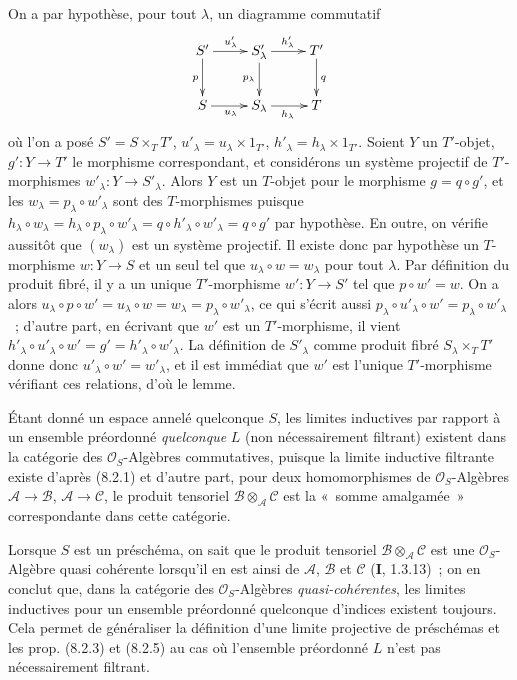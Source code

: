 On a par hypothèse, pour tout $\lambda$, un diagramme commutatif
\[
\xymatrix{
  S' \ar[r]^{u'_\lambda} \ar[d]_p
    & S'_\lambda \ar[r]^{h'_\lambda} \ar[d]_{p_\lambda}
    & T' \ar[d]^q \\
  S \ar[r]_{u_\lambda} & S_\lambda \ar[r]_{h_\lambda} & T
}
\]
où l'on a posé $S'=S\times_T T'$, $u'_\lambda=u_\lambda\times 1_{T'}$,
$h'_\lambda=h_\lambda\times 1_{T'}$. Soient $Y$ un $T'$-objet,
$g':Y\to T'$ le morphisme correspondant, et considérons un système
projectif de $T'$-morphismes $w'_\lambda:Y\to S'_\lambda$. Alors $Y$ est un
$T$-objet pour le morphisme $g=q\circ g'$, et les
$w_\lambda=p_\lambda\circ w'_\lambda$ sont des $T$-morphismes puisque
$h_\lambda\circ w_\lambda=h_\lambda\circ p_\lambda\circ w'_\lambda
=q\circ h'_\lambda\circ w'_\lambda=q\circ g'$ par hypothèse. En outre, on
vérifie aussitôt que $(w_\lambda)$ est un système projectif. Il existe donc
par hypothèse un $T$-morphisme $w:Y\to S$ et un seul tel que
$u_\lambda\circ w=w_\lambda$ pour tout $\lambda$. Par définition du produit
fibré, il y a un unique $T'$-morphisme $w':Y\to S'$ tel que
$p\circ w'=w$. On a alors
$u_\lambda\circ p\circ w'=u_\lambda\circ w=w_\lambda
=p_\lambda\circ w'_\lambda$, ce qui s'écrit aussi
$p_\lambda\circ u'_\lambda\circ w'=p_\lambda\circ w'_\lambda$~; d'autre
part, en écrivant que $w'$ est un $T'$-morphisme, il vient
$h'_\lambda\circ u'_\lambda\circ w'=g'=h'_\lambda\circ w'_\lambda$. La
définition de $S'_\lambda$ comme produit fibré $S_\lambda\times_T T'$ donne
donc $u'_\lambda\circ w'=w'_\lambda$, et il est immédiat que $w'$ est
l'unique $T'$-morphisme vérifiant ces relations, d'où le lemme.

\begin{remark}[8.2.7]
\label{IV.8.2.7-fr}
Étant donné un espace annelé quelconque $S$, les limites inductives par
rapport à un ensemble préordonné \emph{quelconque} $L$ (non nécessairement
filtrant) existent dans la catégorie des $\mathcal O_S$-Algèbres
commutatives, puisque la limite inductive filtrante existe d'après (8.2.1) et
d'autre part, pour deux homomorphismes de $\mathcal O_S$-Algèbres
$\mathscr A\to\mathscr B$, $\mathscr A\to\mathscr C$, le produit tensoriel
$\mathscr B\otimes_{\mathscr A}\mathscr C$ est la «~somme amalgamée~»
correspondante dans cette catégorie.

Lorsque $S$ est un préschéma, on sait que le produit tensoriel
$\mathscr B\otimes_{\mathscr A}\mathscr C$ est une $\mathcal O_S$-Algèbre
quasi cohérente lorsqu'il en est ainsi de $\mathscr A$, $\mathscr B$ et
$\mathscr C$ (\textbf{I}, 1.3.13)~; on en conclut que, dans la catégorie des
$\mathcal O_S$-Algèbres \emph{quasi-cohérentes}, les limites inductives pour
un ensemble préordonné quelconque d'indices existent toujours. Cela permet de
généraliser la définition d'une limite projective de préschémas et les prop.
(8.2.3) et (8.2.5) au cas où l'ensemble préordonné $L$ n'est pas
nécessairement filtrant.
\end{remark}

